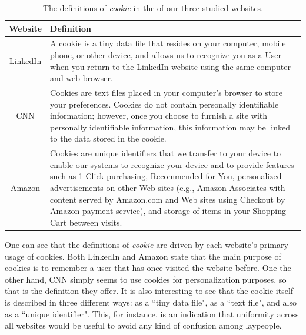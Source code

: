 \documentclass{acm_proc_article-sp}
\begin{document}
\begin{table}[htbp]
  \centering
  \caption{The definitions of \textit{cookie} in the \pps of our three studied websites.}
    \begin{tabular}{|c|p{6.5cm}|}
    \hline
    \textbf{Website} & \textbf{Definition} \\    
     \hline
     LinkedIn &  A cookie is a tiny data file that resides on your computer, mobile phone, or other device, and allows us to recognize you as a User when you return to the LinkedIn website using the same computer and web browser. \\
     \hline
     CNN & Cookies are text files placed in your computer's browser to store your preferences. Cookies do not contain personally identifiable information; however, once you choose to furnish a site with personally identifiable information, this information may be linked to the data stored in the cookie. \\
\hline
     Amazon & Cookies are unique identifiers that we transfer to your device to enable our systems to recognize your device and to provide features such as 1-Click purchasing, Recommended for You, personalized advertisements on other Web sites (e.g., Amazon Associates with content served by Amazon.com and Web sites using Checkout by Amazon payment service), and storage of items in your Shopping Cart between visits.  \\
     \hline
    \end{tabular}%
  \label{tab:cookie-defs}%
\end{table}%

One can see that the definitions of \textit{cookie} are driven by each website's primary usage of cookies. Both LinkedIn and Amazon state that the main purpose of cookies is to remember a user that has once visited the website before. One the other hand, CNN simply seems to use cookies for personalization purposes, so that is the definition they offer. It is also interesting to see that the cookie itself is described in three different ways: as a ``tiny data file", as a ``text file", and also as a ``unique identifier". This, for instance, is an indication that uniformity across all websites would be useful to avoid any kind of confusion among laypeople. 
\end{document}
